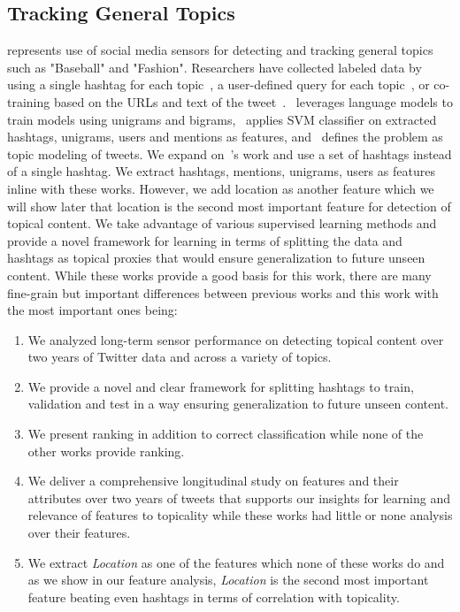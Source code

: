 \subsection*{Tracking General Topics} 
represents use of social media sensors for detecting and tracking general topics such as "Baseball" and "Fashion". Researchers have collected labeled data by using a single hashtag for each topic~\cite{lin2011smoothing}, a user-defined query for each topic~\cite{magdy}, or co-training based on the URLs and text of the tweet~\cite{yang2014large}.~\cite{lin2011smoothing} leverages language models to train models using unigrams and bigrams,~\cite{magdy} applies SVM classifier on extracted hashtags, unigrams, users and mentions as features, and~\cite{yang2014large} defines the problem as topic modeling of tweets. We expand on~\cite{lin2011smoothing}'s work and use a set of hashtags instead of a single hashtag. We extract hashtags, mentions, unigrams, users as features inline with these works. However, we add location as another feature which we will show later that location is the second most important feature for detection of topical content. We take advantage of various supervised learning methods and provide a novel framework for learning in terms of splitting the data and hashtags as topical proxies that would ensure generalization to future unseen content. While these works provide a good basis for this work, there are many fine-grain but important differences between previous works and this work with the most important ones being:
\begin{enumerate}
\item We analyzed long-term sensor performance on detecting topical content over two years of Twitter data and across a variety of topics.
\item We provide a novel and clear framework for splitting hashtags to train, validation and test in a way ensuring generalization to future unseen content.
\item We present ranking in addition to correct classification while none of the other works provide ranking.
\item We deliver a comprehensive longitudinal study on features and their attributes over two years of tweets that supports our insights for learning and relevance of features to topicality while these works had little or none analysis over their features.
\item We extract \textit{Location} as one of the features which none of these works do and as we show in our feature analysis, \textit{Location} is the second most important feature beating even hashtags in terms of correlation with topicality.
\end{enumerate}
